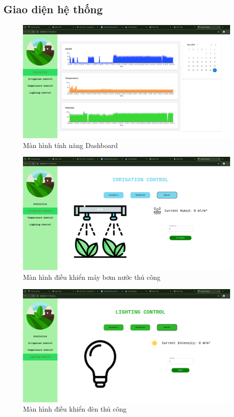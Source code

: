 \subsection{Giao diện hệ thống}

\begin{figure}[H]
    \centering
    \includegraphics[width=1\linewidth]{content/images/statistics.png}
    \caption{Màn hình tính năng Dashboard}
\end{figure}

\begin{figure}[H]
    \centering
    \includegraphics[width=1\linewidth]{content/images/pump_manual.png}
    \caption{Màn hình điều khiển máy bơm nước thủ công}
\end{figure}

\begin{figure}[H]
    \centering
    \includegraphics[width=1\linewidth]{content/images/light_manual.png}
    \caption{Màn hình điều khiển đèn thủ công}
\end{figure}

